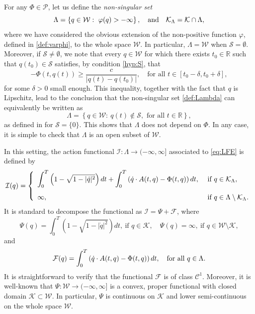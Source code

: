 \documentclass{article}
\newcommand{\boK}{\mathcal{K}}
\newcommand{\boI}{\mathcal{I}}
\newcommand{\R}{\mathbb{R}}
\newcommand{\boW}{\mathcal{W}}
\newcommand{\boF}{\mathcal{F}}
\newcommand{\boP}{\mathcal{P}}
\newcommand{\boS}{\mathcal{S}}
\newcommand{\dq}{\dot{q}}
\theoremstyle{definition}
\begin{document}
For any $\Phi\in\boP$, let us define the \textsl{non-singular set}
\begin{equation}\label{def:Lambda}
	\Lambda=\left\{q\in\boW:\ \varphi(q)>-\infty\right\},\quad\hbox{and}\quad\boK_\Lambda=\boK\cap\Lambda,
\end{equation} 
where we have considered the obvious extension of the non-positive function $\varphi$, defined in \eqref{def:varphi}, to the whole space $\boW$. In particular, $\Lambda=\boW$ when $\boS=\emptyset$. Moreover, if $\boS\not=\emptyset$, we note that every $q\in\boW$ for which there exists $t_0\in \R$ such that $q(t_0)\in\boS$ satisfies, by condition \eqref{hyp:S}, that
\[-\Phi(t,q(t))\geq \frac{c}{|q(t)-q(t_0)|},\quad\text{for all }t\in [t_0-\delta,t_0+\delta],\]
for some $\delta>0$ small enough. This inequality, together with the fact that $q$ is Lipschitz, lead to the conclusion that the non-singular set \eqref{def:Lambda} can equivalently be written as
\[\Lambda=\left\{q\in\boW:\ q(t)\not\in\boS,\text{ for all }t\in\R\right\},\]
as defined in \cite{AS} for $\boS=\{0\}$. This shows that $\Lambda$ does not depend on $\Phi$. In any case, it is simple to check that $\Lambda$ is an open subset of $\boW$.


In this setting, the action functional $\boI:\Lambda\to(-\infty,\infty]$ associated to \eqref{eq:LFE} is defined by
\begin{equation}\label{eq:functional}
    \boI(q)=\left\{\begin{array}{ll}
    	\displaystyle\int_0^T \left(1-\sqrt{1-|\dq|^2}\right)dt + \displaystyle\int_0^T \left(\dq\cdot A(t,q)-\Phi(t,q)\right)dt,  &\text{ if }q\in\boK_\Lambda,
        
        \vspace{0.3 cm}
        \\
        
    	\infty,\quad &\text{ if }q\in\Lambda\setminus\boK_\Lambda.
    \end{array}\right.
\end{equation}
It is standard to decompose the functional as $\boI = \Psi + \mathcal{F}$, where
 \begin{equation}\label{eq:Psi}
    \Psi(q)=\int_0^T \left(1-\sqrt{1-|\dq|^2}\right)dt,\ \text{if }q\in\boK, \quad \Psi(q)=\infty,\ \text{if } q\in\boW\setminus\boK,
\end{equation}
and
\begin{equation}\label{eq:F}
    \boF(q)=\int_0^T \left(\dq\cdot A(t,q)-\Phi(t,q)\right)dt,\quad \hbox{for all  }q\in\Lambda.
\end{equation}
It is straightforward to verify that the functional $\boF$ is of class $\mathcal{C}^1$. Moreover, it is well-known that $\Psi:\boW \to (-\infty,\infty]$ is a convex, proper functional with closed domain $\boK \subset \boW$. In particular, $\Psi$ is continuous on $\boK$ and lower semi-continuous on the whole space $\boW$. 
\end{document}
